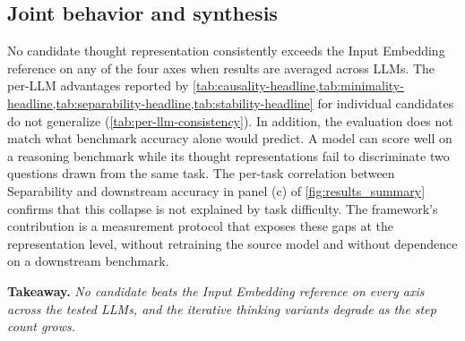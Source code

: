 \subsection{Joint behavior and synthesis}
\label{sec:results:joint}

No candidate thought representation consistently exceeds the Input Embedding reference on any of the four axes when results are averaged across LLMs. The per-LLM advantages reported by \cref{tab:causality-headline,tab:minimality-headline,tab:separability-headline,tab:stability-headline} for individual candidates do not generalize (\cref{tab:per-llm-consistency}). In addition, the evaluation does not match what benchmark accuracy alone would predict. A model can score well on a reasoning benchmark while its thought representations fail to discriminate two questions drawn from the same task. The per-task correlation between Separability and downstream accuracy in panel (c) of \cref{fig:results_summary} confirms that this collapse is not explained by task difficulty. The framework's contribution is a measurement protocol that exposes these gaps at the representation level, without retraining the source model and without dependence on a downstream benchmark.

\textbf{Takeaway.} \textit{No candidate beats the Input Embedding reference on every axis across the tested LLMs, and the iterative thinking variants degrade as the step count grows.}

\FloatBarrier
